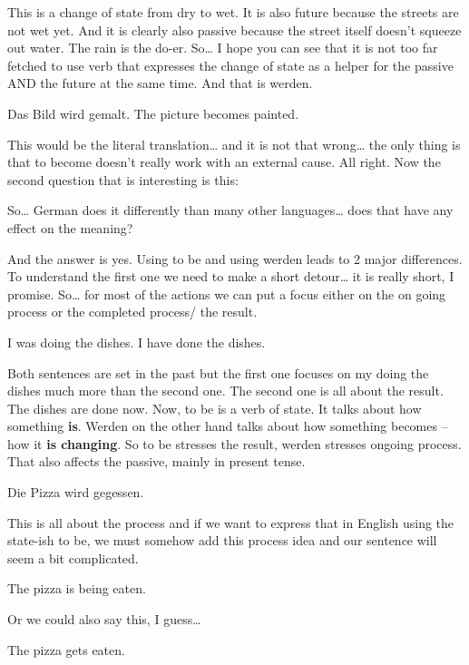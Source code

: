 \documentclass[a4paper,12pt]{article}
\begin{document}
\begin{adjustwidth}{2em}{0pt}
\begin{adjustwidth}{3em}{0pt}
This is a change of state from dry to wet. It is also future because the streets are not wet yet. And it is clearly also passive because the street itself doesn’t squeeze out water. The rain is the do-er.
So… I hope you can see that it is not too far fetched to use verb that expresses the change of state as a helper for the passive AND the future at the same time.  And that is werden.

    Das Bild wird gemalt.
    The picture becomes painted.

This would be the literal translation… and it is not that wrong… the only thing is that to become doesn’t really work with an external cause.
All right.
Now the second question that is interesting is this:

So… German does it differently than many other languages…
does that have any effect on the meaning?

And the answer is yes. Using to be and using werden leads to 2 major
differences.  To understand the first one we need to make a short detour… it is
really short, I promise. So… for most of the actions we can put a focus either
on the on going process or the completed process/ the result.

    I was doing the dishes.
    I have done the dishes.

Both sentences are set in the past but the first one focuses on my doing the
dishes much more than the second one. The second one is all about the result.
The dishes are done now.  Now, to be is a verb of state. It talks about how
something \textbf {is}. Werden on the other hand talks about how something becomes – how
it \textbf{is changing}. So to be stresses the result, werden stresses ongoing process.
That also affects the passive, mainly in present tense.

    Die  Pizza wird gegessen.

This is all about the process and if we want to express that in English using
the state-ish to be, we must somehow add this process idea and our sentence will
seem a bit complicated.

    The pizza is being eaten.

Or we could also say this, I guess…

    The pizza gets eaten.


\end{adjustwidth}
\end{adjustwidth}
\end{document}
